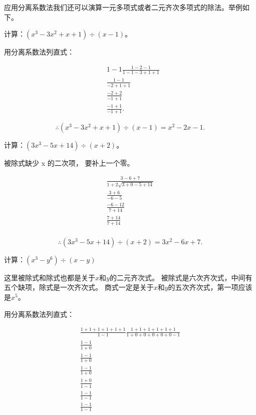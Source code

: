 应用分离系数法我们还可以演算一元多项式或者二元齐次多项式的除法。举例如下。

 计算：\((x^{3}-3x^{2}+x+1)\div(x-1)\)。

 用分离系数法列直式：

\[
\begin{array}{rl} & 1 - 1 \frac{1 - 2 - 1}{1 - 1 - 3 + 1 + 1} \\ & \frac{1 - 1}{- 2 + 1 + 1} \\ & \frac{- 2 + 2}{- 1 + 1} \\ & \frac{- 1 + 1}{- 1 + 1}. \end{array}
\]

\[
\therefore (x ^{3} - 3 x ^{2} + x + 1) \div (x - 1) = x ^{2} - 2 x - 1.
\]

 计算：\((3x^{3}-5x+14)\div(x+2)\)。

 被除式缺少 x 的二次项， 要补上一个零。


\[
\begin{array}{l} \frac{3 - 6 + 7}{1 + 2 \sqrt {3 + 0 - 5 + 14}} \\ \frac{3 + 6}{- 6 - 5} \\ \frac{- 6 - 12}{7 + 14} \\ \frac{7 + 14}{7 + 14} \\ \end{array}
\]

\[
\therefore (3 x ^{3} - 5 x + 14) \div (x + 2) = 3 x ^{2} - 6 x + 7.
\]

 计算：\((x^{3} - y^{6})\div (x - y)\)

 这里被除式和除式也都是关于\(x\)和\(y\)的二元齐次式。
被除式是六次齐次式，中间有五个缺项，除式是一次齐次式。
商式一定是关于\(x\)和\(y\)的五次齐次式，第一项应该是\(x^5\)。

 用分离系数法列直式：

\[
\begin{array}{l} \frac{1 + 1 + 1 + 1 + 1 + 1}{1 - 1} \frac{1 + 1 + 1 + 1 + 1 + 1}{1 + 0 + 0 + 0 + 0 + 0 - 1} \\ \frac{1 - 1}{1 + 0} \\ \frac{1 - 1}{1 + 0} \\ \frac{1 - 1}{1 + 0} \\ \frac{1 + 0}{1 - 1} \\ \frac{1 - 1}{1 - 1} \\ \frac{1 - 1}{1 - 1} \\ \end{array}
\]

